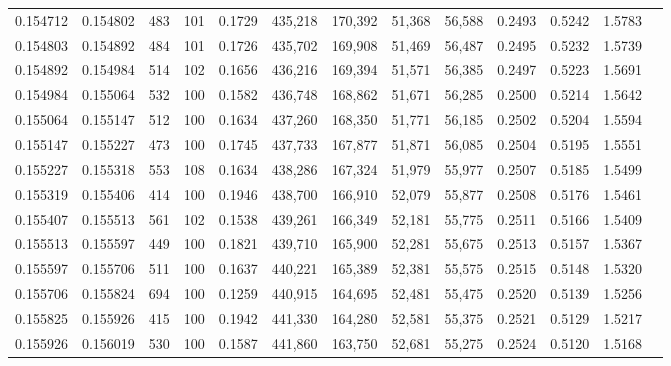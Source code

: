 \begin{tabular}{rrrrrrrrrrrrr}
0.154712 & 0.154802 &   483 & 101 &                                     0.1729 & 435,218 & 170,392 &  51,368 &  56,588 & 0.2493 & 0.5242 & 1.5783 \\
0.154803 & 0.154892 &   484 & 101 &                                     0.1726 & 435,702 & 169,908 &  51,469 &  56,487 & 0.2495 & 0.5232 & 1.5739 \\
0.154892 & 0.154984 &   514 & 102 &                                     0.1656 & 436,216 & 169,394 &  51,571 &  56,385 & 0.2497 & 0.5223 & 1.5691 \\
0.154984 & 0.155064 &   532 & 100 &                                     0.1582 & 436,748 & 168,862 &  51,671 &  56,285 & 0.2500 & 0.5214 & 1.5642 \\
0.155064 & 0.155147 &   512 & 100 &                                     0.1634 & 437,260 & 168,350 &  51,771 &  56,185 & 0.2502 & 0.5204 & 1.5594 \\
0.155147 & 0.155227 &   473 & 100 &                                     0.1745 & 437,733 & 167,877 &  51,871 &  56,085 & 0.2504 & 0.5195 & 1.5551 \\
0.155227 & 0.155318 &   553 & 108 &                                     0.1634 & 438,286 & 167,324 &  51,979 &  55,977 & 0.2507 & 0.5185 & 1.5499 \\
0.155319 & 0.155406 &   414 & 100 &                                     0.1946 & 438,700 & 166,910 &  52,079 &  55,877 & 0.2508 & 0.5176 & 1.5461 \\
0.155407 & 0.155513 &   561 & 102 &                                     0.1538 & 439,261 & 166,349 &  52,181 &  55,775 & 0.2511 & 0.5166 & 1.5409 \\
0.155513 & 0.155597 &   449 & 100 &                                     0.1821 & 439,710 & 165,900 &  52,281 &  55,675 & 0.2513 & 0.5157 & 1.5367 \\
0.155597 & 0.155706 &   511 & 100 &                                     0.1637 & 440,221 & 165,389 &  52,381 &  55,575 & 0.2515 & 0.5148 & 1.5320 \\
0.155706 & 0.155824 &   694 & 100 &                                     0.1259 & 440,915 & 164,695 &  52,481 &  55,475 & 0.2520 & 0.5139 & 1.5256 \\
0.155825 & 0.155926 &   415 & 100 &                                     0.1942 & 441,330 & 164,280 &  52,581 &  55,375 & 0.2521 & 0.5129 & 1.5217 \\
0.155926 & 0.156019 &   530 & 100 &                                     0.1587 & 441,860 & 163,750 &  52,681 &  55,275 & 0.2524 & 0.5120 & 1.5168 \\

\end{tabular}
